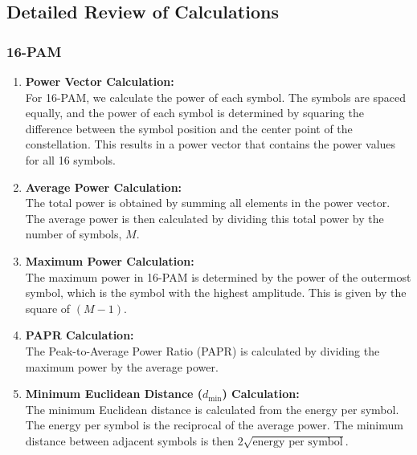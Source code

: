 \documentclass[11pt,a4paper,oneside]{article}
\begin{document}
\subsection{Detailed Review of Calculations}

\subsubsection{16-PAM}
\begin{enumerate}[itemsep=2ex, left=0pt, labelwidth=2em, align=left]
    \item \textbf{Power Vector Calculation:}\\
    For 16-PAM, we calculate the power of each symbol. The symbols are spaced equally, and the power of each symbol is determined by squaring the difference between the symbol position and the center point of the constellation. This results in a power vector that contains the power values for all 16 symbols.
    
    \vspace{1ex}
    
    \item \textbf{Average Power Calculation:}\\
    The total power is obtained by summing all elements in the power vector. The average power is then calculated by dividing this total power by the number of symbols, \(M\).
    
    \vspace{1ex}
    
    \item \textbf{Maximum Power Calculation:}\\
    The maximum power in 16-PAM is determined by the power of the outermost symbol, which is the symbol with the highest amplitude. This is given by the square of \((M - 1)\).
    
    \vspace{1ex}
    
    \item \textbf{PAPR Calculation:}\\
    The Peak-to-Average Power Ratio (PAPR) is calculated by dividing the maximum power by the average power.
    
    \vspace{1ex}
    
    \item \textbf{Minimum Euclidean Distance (\(d_{\text{min}}\)) Calculation:}\\
    The minimum Euclidean distance is calculated from the energy per symbol. The energy per symbol is the reciprocal of the average power. The minimum distance between adjacent symbols is then \(2 \sqrt{\text{energy per symbol}}\).
\end{enumerate}
\end{document}
